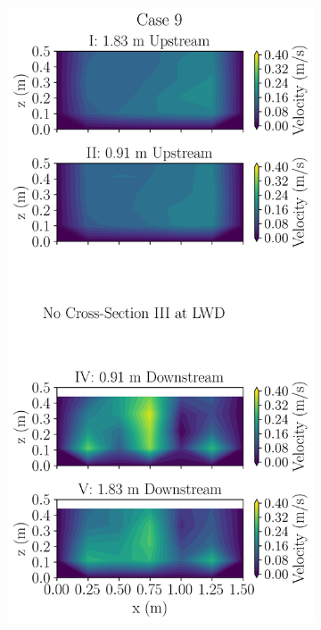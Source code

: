 \documentclass[preview, border=2pt]{standalone}
\begin{document}
\begin{figure}
\begin{subfigure}[b]{0.24\textwidth}
     \end{subfigure}
     \hfill     
     \begin{subfigure}[b]{0.24\textwidth}
         \centering
         \caption{}
         \includegraphics[width=\textwidth]{Case9_velocity_contours.png}

\end{subfigure}
\end{figure}
\end{document}
